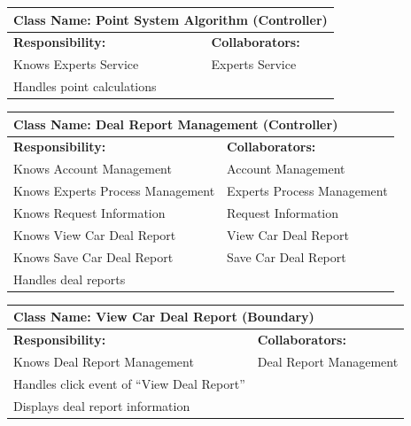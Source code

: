 \documentclass[]{article}
\begin{document}
\begin{table}[H]
  \centering
  \renewcommand{\arraystretch}{1.3} %
  \begin{tabular}{|p{7.5cm}|p{7.5cm}|}
    \hline
    \multicolumn{2}{|l|}{\textbf{Class Name: Point System Algorithm (Controller)}} \\
    \hline
    \textbf{Responsibility:}   & \textbf{Collaborators:}                           \\
    \hline
    Knows Experts Service      & Experts Service                                   \\
    Handles point calculations &                                                   \\
    \hline
  \end{tabular}
\end{table}
\begin{table}[H]
  \centering
  \renewcommand{\arraystretch}{1.3} %
  \begin{tabular}{|p{7.5cm}|p{7.5cm}|}
    \hline
    \multicolumn{2}{|l|}{\textbf{Class Name: Deal Report Management (Controller)}} \\
    \hline
    \textbf{Responsibility:}         & \textbf{Collaborators:}                     \\
    \hline
    Knows Account Management         & Account Management                          \\
    Knows Experts Process Management & Experts Process Management                  \\
    Knows Request Information        & Request Information                         \\
    Knows View Car Deal Report       & View Car Deal Report                        \\
    Knows Save Car Deal Report       & Save Car Deal Report                        \\
    Handles deal reports             &                                             \\
    \hline
  \end{tabular}
\end{table}
\begin{table}[H]
  \centering
  \renewcommand{\arraystretch}{1.3} %
  \begin{tabular}{|p{7.5cm}|p{7.5cm}|}
    \hline
    \multicolumn{2}{|l|}{\textbf{Class Name: View Car Deal Report (Boundary)}} \\
    \hline
    \textbf{Responsibility:}                  & \textbf{Collaborators:}        \\
    \hline
    Knows Deal Report Management              & Deal Report Management         \\
    Handles click event of “View Deal Report” &                                \\
    Displays deal report information          &                                \\
    \hline
  \end{tabular}
\end{table}
\end{document}
